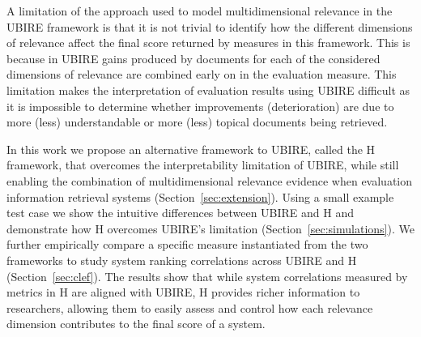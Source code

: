 
A limitation of the approach used to model multidimensional relevance in the UBIRE framework is that it is not trivial to identify how the different dimensions of relevance affect the final score returned by measures in this framework. This is because in UBIRE gains produced by documents for each of the considered dimensions of relevance are combined early on in the evaluation measure. This limitation makes the interpretation of evaluation results using UBIRE difficult as it is impossible to determine whether improvements (deterioration) are due to more (less) understandable or more (less) topical documents being retrieved. 

In this work we propose an alternative framework to UBIRE, called the H framework, that overcomes the interpretability limitation of UBIRE, while still enabling the combination of multidimensional relevance evidence when evaluation information retrieval systems (Section~\ref{sec:extension}). Using a small example test case we show the intuitive differences between UBIRE and H and demonstrate how H overcomes UBIRE's limitation (Section~\ref{sec:simulations}). We further empirically compare a specific measure instantiated from the two frameworks to study system ranking correlations across UBIRE and H (Section~\ref{sec:clef}). The results show that %
%
while system correlations measured by metrics in H are aligned with UBIRE, H provides richer information to researchers, allowing them to easily assess and control how each relevance dimension contributes
to the final score of a system.


